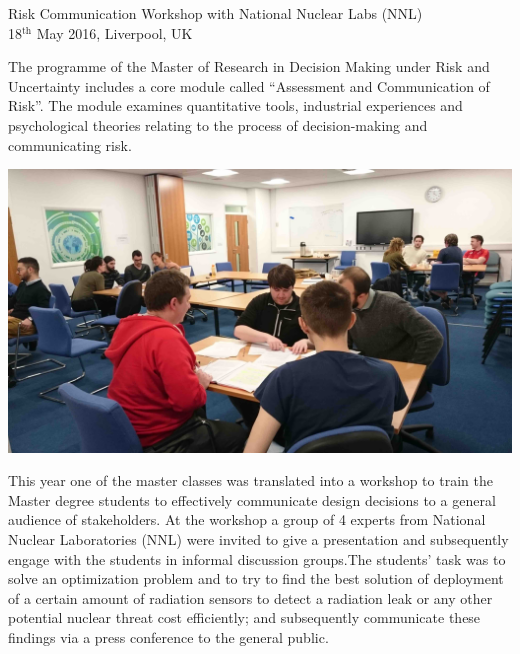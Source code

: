 \documentclass[11pt]{article}%
\begin{document}
\cleardoublepage


\thispagestyle{Training}

\begin{minipage}{1.\textwidth}
\vspace{20pt}
{\LARGE {Risk Communication Workshop with National Nuclear Labs (NNL)}}\\
{\large 18$^{\text{th}}$ May 2016, Liverpool, UK}
\begin{multicols}{2}
The programme of the Master of Research in Decision Making under Risk and Uncertainty includes a core module called “Assessment and Communication of Risk”. The module examines quantitative tools, industrial experiences and psychological theories relating to the process of decision-making and communicating risk.

\includegraphics[width=1\linewidth]{training/Picture6.jpg}

This year one of the master classes was translated into a workshop to train the Master degree students to effectively communicate design decisions to a general audience of stakeholders. At the workshop a group of 4 experts from National Nuclear Laboratories (NNL) were invited to give a presentation and subsequently engage with the students in informal discussion groups.The students’ task was to solve an optimization problem and to try to find the best solution of deployment of a certain amount of radiation sensors to detect a radiation leak or any other potential nuclear threat cost efficiently; and subsequently communicate these findings via a press conference to the general public. 


\end{multicols}
\end{minipage}
\end{document}
